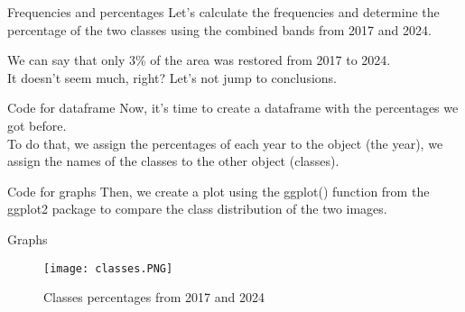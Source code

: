 \documentclass{beamer}
\begin{document}
\begin{frame}{Frequencies and percentages}
   Let's calculate the frequencies and determine the percentage of the two classes using the combined bands from 2017 and 2024.
   
    

    We can say that only 3\% of the area was restored from 2017 to 2024.
    \\ It doesn't seem much, right? Let's not jump to conclusions.
\end{frame}

\begin{frame}{Code for dataframe}
    Now, it's time to create a dataframe with the percentages we got before. \\ To do that, we assign the percentages of each year to the object (the year), we assign the names of the classes to the other object (classes).
  
  

\end{frame}

\begin{frame}{Code for graphs}
    Then, we create a plot using the ggplot() function from the ggplot2 package to compare the class distribution of the two images.
    
     

\end{frame}

\begin{frame}{Graphs} 
\begin{figure}
    \centering
    \texttt{[image: classes.PNG]}
    \caption{Classes percentages from 2017 and 2024}
    \label{fig:enter-label}
\end{figure}
\end{frame}
\end{document}
